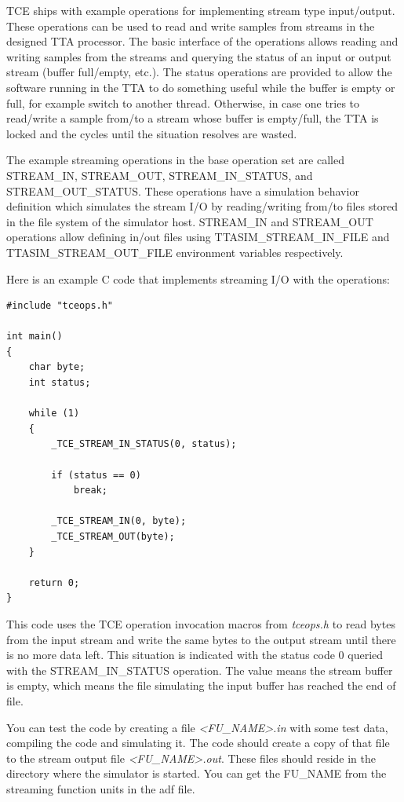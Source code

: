 \documentclass[twoside]{tceusermanual}
\begin{document}
TCE ships with example operations for implementing stream type input/output. 
These operations can be used to read and write samples from streams in the
designed TTA processor. The basic interface of the operations allows reading and 
writing samples from the streams and querying the status of an input or output stream 
(buffer full/empty, etc.). The status operations are provided to
allow the software running in the TTA to do something useful while the
buffer is empty or full, for example switch to another thread. Otherwise,
in case one tries to read/write a sample from/to a stream whose buffer is 
empty/full, the TTA is locked and the cycles until the situation resolves
are wasted.

The example streaming operations in the base operation set are 
called STREAM\_IN, STREAM\_OUT, STREAM\_IN\_STATUS, and STREAM\_OUT\_STATUS.
These operations have a simulation behavior definition which simulates the
stream I/O by reading/writing from/to files stored in the file system of 
the simulator host. STREAM\_IN and STREAM\_OUT operations allow defining
in/out files using TTASIM\_STREAM\_IN\_FILE and TTASIM\_STREAM\_OUT\_FILE
environment variables respectively.

Here is an example C code that implements streaming I/O with the operations:

\begin{verbatim}
#include "tceops.h"

int main()
{
    char byte;
    int status;

    while (1)
    {
        _TCE_STREAM_IN_STATUS(0, status);

        if (status == 0)
            break;

        _TCE_STREAM_IN(0, byte);
        _TCE_STREAM_OUT(byte);
    }

    return 0;
}
\end{verbatim}

This code uses the TCE operation invocation macros from \textit{tceops.h}
to read bytes from the input stream and write the same bytes to the
output stream until there is no more data left. This situation is indicated
with the status code 0 queried with the STREAM\_IN\_STATUS operation. The
value means the stream buffer is empty, which means the file simulating the
input buffer has reached the end of file.

You can test the code by creating a file \textit{<FU\_NAME>.in} with some test
data, compiling the code and simulating it. The code should create a copy of
that file to the stream output file \textit{<FU\_NAME>.out}. These files
should reside in the directory where the simulator is started. You can get
the FU\_NAME from the streaming function units in the adf file.
\end{document}

